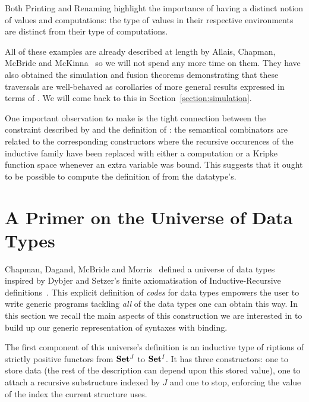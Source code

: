 Both Printing and Renaming highlight the importance of having a distinct
notion of values and computations: the type of values in their respective
environments are distinct from their type of computations.

All of these examples are already described at length by Allais, Chapman,
McBride and McKinna~\citeyear{allais2017type} so we will not spend any
more time on them. They have also obtained the simulation and fusion
theorems demonstrating that these traversals are well-behaved as
corollaries of more general results expressed in terms of .
We will come back to this in Section~\ref{section:simulation}.

One important observation to make is the tight connection between the
constraint described by  and the definition of : the
semantical combinators are related to the corresponding constructors
where the recursive occurences of the inductive family have been replaced
with either a computation or a Kripke function space whenever an
extra variable was bound. This suggests that it ought to be possible
to compute the definition of  from the datatype's.




\section{A Primer on the Universe of Data Types}

Chapman, Dagand, McBride and Morris~\citeyear{Chapman:2010:GAL:1863543.1863547}
defined a universe of data types inspired by Dybjer and Setzer's
finite axiomatisation of Inductive-Recursive definitions~\citeyear{Dybjer1999}.
This explicit definition of \emph{codes} for data types empowers the
user to write generic programs tackling \emph{all} of the data types
one can obtain this way. In this section we recall the main aspects
of this construction we are interested in to build up our generic
representation of syntaxes with binding.

The first component of this universe's definition is an inductive type
of riptions of strictly positive functors from $\mathbf{Set}{}^J$ to
$\mathbf{Set}{}^I$. It has three constructors: one to store data (the rest of
the description can depend upon this stored value), one to attach a
recursive substructure indexed by $J$ and one to stop, enforcing the
value of the index the current structure uses.

